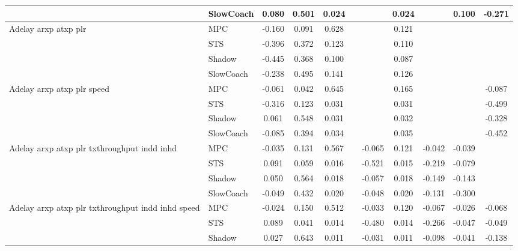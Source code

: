 \begin{tabular}{|l|l|*{9}{c|}}
                              & SlowCoach &    0.080 &     0.501 &     0.024 &     &     &  0.024 &      &   0.100 &   -0.271 \\
\midrule
Adelay arxp atxp plr    & MPC &   -0.160 &     0.091 &     0.628 &     &     &  0.121 &      &      &       \\
                              & STS &   -0.396 &     0.372 &     0.123 &     &     &  0.110 &      &      &       \\
                              & Shadow &   -0.445 &     0.368 &     0.100 &     &     &  0.087 &      &      &       \\
                              & SlowCoach &   -0.238 &     0.495 &     0.141 &     &     &  0.126 &      &      &       \\
\midrule
Adelay arxp atxp plr speed    & MPC &   -0.061 &     0.042 &     0.645 &     &     &  0.165 &      &      &   -0.087 \\
                              & STS &   -0.316 &     0.123 &     0.031 &     &     &  0.031 &      &      &   -0.499 \\
                              & Shadow &    0.061 &     0.548 &     0.031 &     &     &  0.032 &      &      &   -0.328 \\
                              & SlowCoach &   -0.085 &     0.394 &     0.034 &     &     &  0.035 &      &      &   -0.452 \\
\midrule
Adelay arxp atxp plr txthroughput indd inhd    & MPC &   -0.035 &     0.131 &     0.567 &     & -0.065 &  0.121 &  -0.042 &  -0.039 &       \\
                              & STS &    0.091 &     0.059 &     0.016 &     & -0.521 &  0.015 &  -0.219 &  -0.079 &       \\
                              & Shadow &    0.050 &     0.564 &     0.018 &     & -0.057 &  0.018 &  -0.149 &  -0.143 &       \\
                              & SlowCoach &   -0.049 &     0.432 &     0.020 &     & -0.048 &  0.020 &  -0.131 &  -0.300 &       \\
\midrule
Adelay arxp atxp plr txthroughput indd inhd speed    & MPC &   -0.024 &     0.150 &     0.512 &     & -0.033 &  0.120 &  -0.067 &  -0.026 &   -0.068 \\
                              & STS &    0.089 &     0.041 &     0.014 &     & -0.480 &  0.014 &  -0.266 &  -0.047 &   -0.049 \\
                              & Shadow &    0.027 &     0.643 &     0.011 &     & -0.031 &  0.011 &  -0.098 &  -0.041 &   -0.138 \\

\end{tabular}
